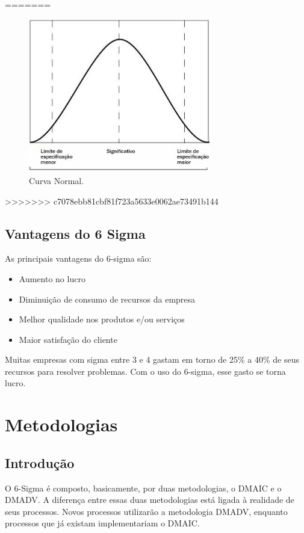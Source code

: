\documentclass{abnt}
\begin{document}
=======
			\begin{figure}[h]
				\centering
				\includegraphics[width=8cm, keepaspectratio]{img/curva.jpg}
				\caption{Curva Normal.}
			\end{figure}
	    
>>>>>>> c7078ebb81cbf81f723a5633e0062ae73491b144
		\section {Vantagens do 6 Sigma}
		
		As principais vantagens do 6-sigma são: 
		\begin{itemize}
			\item {Aumento no lucro}
			\item {Diminuição de consumo de recursos da empresa}
			\item {Melhor qualidade nos produtos e/ou serviços}
			\item {Maior satisfação do cliente}
		\end{itemize}
		
		Muitas empresas com sigma entre 3 e 4 gastam em torno de 25\% a 40\% de seus recursos para resolver problemas. Com o uso do 6-sigma, esse gasto se torna lucro.
		  
				
	\chapter {Metodologias}
		\section {Introdução}
		
			 O 6-Sigma é composto, basicamente, por duas metodologias, o DMAIC e o DMADV. A diferença entre 
			 essas duas metodologias está ligada à realidade de seus processos. Novos processos utilizarão 
			 a metodologia DMADV, enquanto processos que já existam implementariam o DMAIC.
			 
\end{document}
